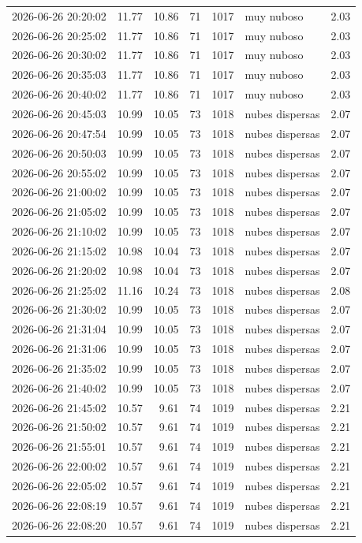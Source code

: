 \documentclass{article}
\begin{document}
\begin{enumerate}
\begin{enumerate}
\begin{table}[htbp]
\begin{tabular}{lrrrrlr}
2026-06-26 20:20:02 & 11.77 & 10.86 & 71 & 1017 & muy nuboso & 2.03\\
2026-06-26 20:25:02 & 11.77 & 10.86 & 71 & 1017 & muy nuboso & 2.03\\
2026-06-26 20:30:02 & 11.77 & 10.86 & 71 & 1017 & muy nuboso & 2.03\\
2026-06-26 20:35:03 & 11.77 & 10.86 & 71 & 1017 & muy nuboso & 2.03\\
2026-06-26 20:40:02 & 11.77 & 10.86 & 71 & 1017 & muy nuboso & 2.03\\
2026-06-26 20:45:03 & 10.99 & 10.05 & 73 & 1018 & nubes dispersas & 2.07\\
2026-06-26 20:47:54 & 10.99 & 10.05 & 73 & 1018 & nubes dispersas & 2.07\\
2026-06-26 20:50:03 & 10.99 & 10.05 & 73 & 1018 & nubes dispersas & 2.07\\
2026-06-26 20:55:02 & 10.99 & 10.05 & 73 & 1018 & nubes dispersas & 2.07\\
2026-06-26 21:00:02 & 10.99 & 10.05 & 73 & 1018 & nubes dispersas & 2.07\\
2026-06-26 21:05:02 & 10.99 & 10.05 & 73 & 1018 & nubes dispersas & 2.07\\
2026-06-26 21:10:02 & 10.99 & 10.05 & 73 & 1018 & nubes dispersas & 2.07\\
2026-06-26 21:15:02 & 10.98 & 10.04 & 73 & 1018 & nubes dispersas & 2.07\\
2026-06-26 21:20:02 & 10.98 & 10.04 & 73 & 1018 & nubes dispersas & 2.07\\
2026-06-26 21:25:02 & 11.16 & 10.24 & 73 & 1018 & nubes dispersas & 2.08\\
2026-06-26 21:30:02 & 10.99 & 10.05 & 73 & 1018 & nubes dispersas & 2.07\\
2026-06-26 21:31:04 & 10.99 & 10.05 & 73 & 1018 & nubes dispersas & 2.07\\
2026-06-26 21:31:06 & 10.99 & 10.05 & 73 & 1018 & nubes dispersas & 2.07\\
2026-06-26 21:35:02 & 10.99 & 10.05 & 73 & 1018 & nubes dispersas & 2.07\\
2026-06-26 21:40:02 & 10.99 & 10.05 & 73 & 1018 & nubes dispersas & 2.07\\
2026-06-26 21:45:02 & 10.57 & 9.61 & 74 & 1019 & nubes dispersas & 2.21\\
2026-06-26 21:50:02 & 10.57 & 9.61 & 74 & 1019 & nubes dispersas & 2.21\\
2026-06-26 21:55:01 & 10.57 & 9.61 & 74 & 1019 & nubes dispersas & 2.21\\
2026-06-26 22:00:02 & 10.57 & 9.61 & 74 & 1019 & nubes dispersas & 2.21\\
2026-06-26 22:05:02 & 10.57 & 9.61 & 74 & 1019 & nubes dispersas & 2.21\\
2026-06-26 22:08:19 & 10.57 & 9.61 & 74 & 1019 & nubes dispersas & 2.21\\
2026-06-26 22:08:20 & 10.57 & 9.61 & 74 & 1019 & nubes dispersas & 2.21\\
\end{tabular}
\end{table}
\end{enumerate}
\end{enumerate}
\end{document}
